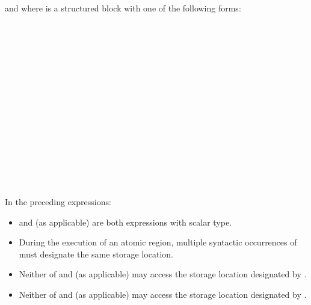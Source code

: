 {{{{\begin{itemize}
and where  is a structured block with one of the following forms:

\begin{figure}[t!]
\end{figure}

\\
\\
\\
\\
\\
\\
\\
\\
\\
\\
\\
\\
\\
\\
\end{itemize}

In the preceding expressions:

\begin{itemize}
\item {} and  (as applicable) are both  expressions with scalar type.

\item During the execution of an atomic region, multiple syntactic occurrences of  must 
designate the same storage location.

\item Neither of  and  (as applicable) may access the storage location designated by .

\item Neither of  and  (as applicable) may access the storage location designated by .


\end{itemize}}}}}
